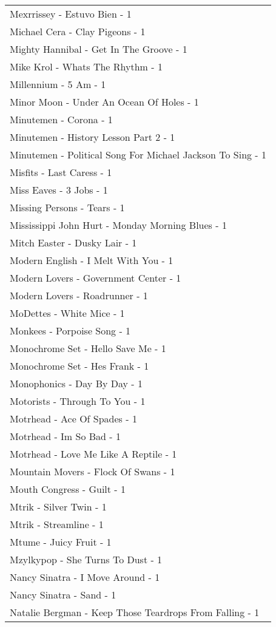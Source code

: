 \documentclass[
]{article}
\begin{document}
\begin{longtable}{l}
Mexrrissey - Estuvo Bien - 1 \\ 
Michael Cera - Clay Pigeons - 1 \\ 
Mighty Hannibal - Get In The Groove - 1 \\ 
Mike Krol - Whats The Rhythm - 1 \\ 
Millennium - 5 Am - 1 \\ 
Minor Moon - Under An Ocean Of Holes - 1 \\ 
Minutemen - Corona - 1 \\ 
Minutemen - History Lesson Part 2 - 1 \\ 
Minutemen - Political Song For Michael Jackson To Sing - 1 \\ 
Misfits - Last Caress - 1 \\ 
Miss Eaves - 3 Jobs - 1 \\ 
Missing Persons - Tears - 1 \\ 
Mississippi John Hurt - Monday Morning Blues - 1 \\ 
Mitch Easter - Dusky Lair - 1 \\ 
Modern English - I Melt With You - 1 \\ 
Modern Lovers - Government Center - 1 \\ 
Modern Lovers - Roadrunner - 1 \\ 
MoDettes - White Mice - 1 \\ 
Monkees - Porpoise Song - 1 \\ 
Monochrome Set - Hello Save Me - 1 \\ 
Monochrome Set - Hes Frank - 1 \\ 
Monophonics - Day By Day - 1 \\ 
Motorists - Through To You - 1 \\ 
Motrhead - Ace Of Spades - 1 \\ 
Motrhead - Im So Bad - 1 \\ 
Motrhead - Love Me Like A Reptile - 1 \\ 
Mountain Movers - Flock Of Swans - 1 \\ 
Mouth Congress - Guilt - 1 \\ 
Mtrik - Silver Twin - 1 \\ 
Mtrik - Streamline - 1 \\ 
Mtume - Juicy Fruit - 1 \\ 
Mzylkypop - She Turns To Dust - 1 \\ 
Nancy Sinatra - I Move Around - 1 \\ 
Nancy Sinatra - Sand - 1 \\ 
Natalie Bergman - Keep Those Teardrops From Falling - 1 \\ 

\end{longtable}
\end{document}
